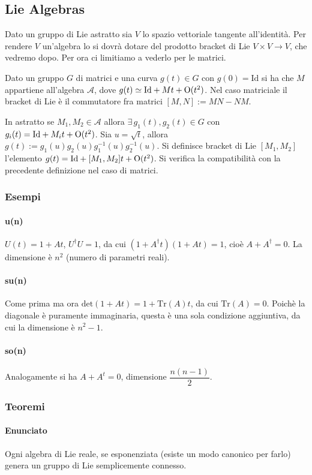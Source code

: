 \documentclass[12pt,oneside,notitlepage,abstracton,a4paper]{scrartcl}
\newcommand{\A}{\mathcal{A}}
\begin{document}
\subsection{Lie Algebras}
Dato un gruppo di Lie astratto sia $V$ lo spazio vettoriale tangente all'identità. Per rendere $V$ un'algebra lo si dovrà dotare del prodotto bracket di Lie $V\times V \rightarrow V$, che vedremo dopo. Per ora ci limitiamo a vederlo per le matrici.

Dato un gruppo $G$ di matrici e una curva $g(t)\in G$ con $g(0) = \mathrm{Id}$ si ha che $M$ appartiene all'algebra $\A$, dove $g(t) \simeq \mathrm{Id} + M t + \mathrm{O}(t^2)$. Nel caso matriciale il bracket di Lie è il commutatore fra matrici $[M,N] := MN-NM$.

In astratto se $M_1,M_2\in \A$ allora $\exists\, g_1(t),g_2(t)\in G$ con $g_i(t) = \mathrm{Id} + M_i t + \mathrm{O}(t^2)$. Sia $u = \sqrt{t}$, allora $g(t) := g_1(u)g_2(u)g_1^{-1}(u)g_2^{-1}(u)$. Si definisce bracket di Lie $[M_1,M_2]$ l'elemento $g(t) = \mathrm{Id} + [M_1,M_2] t + \mathrm{O}(t^2)$. Si verifica la compatibilità con la precedente definizione nel caso di matrici.

\subsubsection{Esempi}
\paragraph{u(n)} $U(t) = 1 + At$, $U^\dagger U = 1$, da cui $(1+A^\dagger t)(1+At) = 1$, cioè $A+A^\dagger = 0$. La dimensione è $n^2$ (numero di parametri reali).
\paragraph{su(n)} Come prima ma ora $\mathrm{det}(1+At)=1+\mathrm{Tr}(A)t$, da cui $\mathrm{Tr}(A) = 0$. Poichè la diagonale è puramente immaginaria, questa è una sola condizione aggiuntiva, da cui la dimensione è $n^2-1$.
\paragraph{so(n)} Analogamente si ha $A + A^t = 0$, dimensione $\dfrac{n(n-1)}{2}$.

\subsubsection{Teoremi}
\paragraph{Enunciato} Ogni algebra di Lie reale, se esponenziata (esiste un modo canonico per farlo) genera un gruppo di Lie semplicemente connesso.
\end{document}
